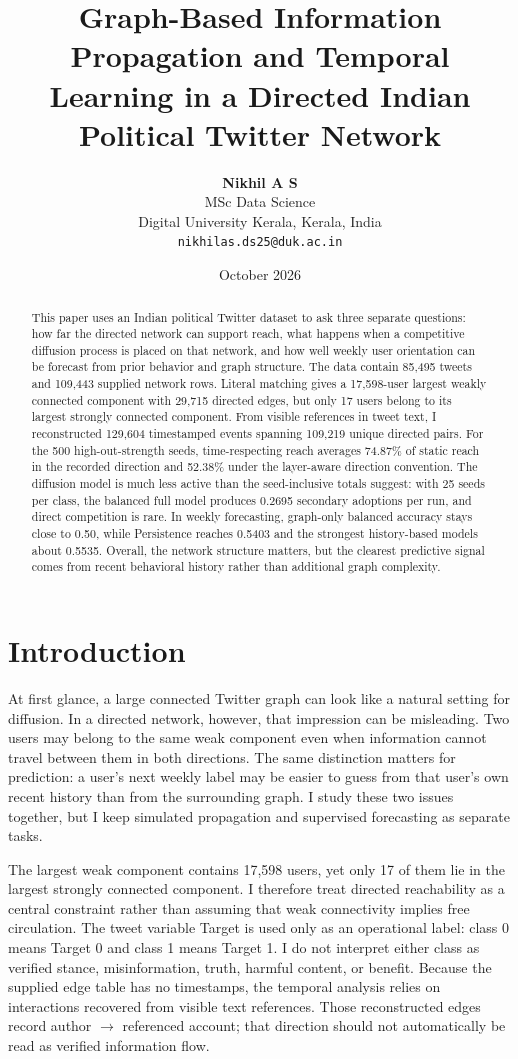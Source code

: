 \documentclass[11pt,a4paper]{article}
\title{\textbf{Graph-Based Information Propagation and Temporal Learning in a Directed Indian Political Twitter Network}}
\author{\textbf{Nikhil A S}\\MSc Data Science\\Digital University Kerala, Kerala, India\\\texttt{nikhilas.ds25@duk.ac.in}}
\date{October 2026}
\begin{document}
\maketitle

\begin{abstract}
This paper uses an Indian political Twitter dataset to ask three separate questions: how far the directed network can support reach, what happens when a competitive diffusion process is placed on that network, and how well weekly user orientation can be forecast from prior behavior and graph structure. The data contain 85,495 tweets and 109,443 supplied network rows. Literal matching gives a 17,598-user largest weakly connected component with 29,715 directed edges, but only 17 users belong to its largest strongly connected component. From visible references in tweet text, I reconstructed 129,604 timestamped events spanning 109,219 unique directed pairs. For the 500 high-out-strength seeds, time-respecting reach averages 74.87\% of static reach in the recorded direction and 52.38\% under the layer-aware direction convention. The diffusion model is much less active than the seed-inclusive totals suggest: with 25 seeds per class, the balanced full model produces 0.2695 secondary adoptions per run, and direct competition is rare. In weekly forecasting, graph-only balanced accuracy stays close to 0.50, while Persistence reaches 0.5403 and the strongest history-based models about 0.5535. Overall, the network structure matters, but the clearest predictive signal comes from recent behavioral history rather than additional graph complexity.
\end{abstract}

\section{Introduction}
At first glance, a large connected Twitter graph can look like a natural setting for diffusion. In a directed network, however, that impression can be misleading. Two users may belong to the same weak component even when information cannot travel between them in both directions. The same distinction matters for prediction: a user's next weekly label may be easier to guess from that user's own recent history than from the surrounding graph. I study these two issues together, but I keep simulated propagation and supervised forecasting as separate tasks.

The largest weak component contains 17,598 users, yet only 17 of them lie in the largest strongly connected component. I therefore treat directed reachability as a central constraint rather than assuming that weak connectivity implies free circulation. The tweet variable Target is used only as an operational label: class 0 means Target 0 and class 1 means Target 1. I do not interpret either class as verified stance, misinformation, truth, harmful content, or benefit. Because the supplied edge table has no timestamps, the temporal analysis relies on interactions recovered from visible text references. Those reconstructed edges record author $\rightarrow$ referenced account; that direction should not automatically be read as verified information flow.
\end{document}
